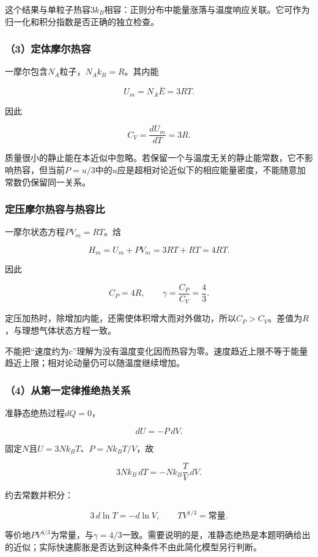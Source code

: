 \documentclass[12pt,a4paper,fontset=fandol]{ctexart}
\begin{document}
这个结果与单粒子热容\(3k_B\)相容：正则分布中能量涨落与温度响应关联。它可作为归一化和积分指数是否正确的独立检查。

\subsubsection{（3）定体摩尔热容}\label{ux5b9aux4f53ux6469ux5c14ux70edux5bb9}

一摩尔包含\(N_A\)粒子，\(N_Ak_B=R\)。其内能

\[
U_m=N_A\bar E=3RT.
\]

因此

\[
\boxed{C_V=\frac{dU_m}{dT}=3R}.
\]

质量很小的静止能在本近似中忽略。若保留一个与温度无关的静止能常数，它不影响热容，但当前\(P=u/3\)中的\(u\)应是超相对论近似下的相应能量密度，不能随意加常数仍保留同一关系。

\subsubsection{定压摩尔热容与热容比}\label{ux5b9aux538bux6469ux5c14ux70edux5bb9ux4e0eux70edux5bb9ux6bd4}

一摩尔状态方程\(PV_m=RT\)。焓

\[
H_m=U_m+PV_m=3RT+RT=4RT.
\]

因此

\[
\boxed{C_P=4R,\qquad\gamma=\frac{C_P}{C_V}=\frac43}.
\]

定压加热时，除增加内能，还需使体积增大而对外做功，所以\(C_P>C_V\)。差值为\(R\)，与理想气体状态方程一致。

不能把``速度约为\(c\)''理解为没有温度变化因而热容为零。速度趋近上限不等于能量趋近上限；相对论动量仍可以随温度继续增加。

\subsubsection{（4）从第一定律推绝热关系}\label{ux4eceux7b2cux4e00ux5b9aux5f8bux63a8ux7eddux70edux5173ux7cfb}

准静态绝热过程\(dQ=0\)，

\[
dU=-P\,dV.
\]

固定\(N\)且\(U=3Nk_BT\)、\(P=Nk_BT/V\)，故

\[
3Nk_B\,dT=-Nk_B\frac{T}{V}\,dV.
\]

约去常数并积分：

\[
3\,d\ln T=-d\ln V,
\qquad
\boxed{TV^{1/3}=\text{常量}}.
\]

等价地\(PV^{4/3}\)为常量，与\(\gamma=4/3\)一致。需要说明的是，准静态绝热是本题明确给出的近似；实际快速膨胀是否达到这种条件不由此简化模型另行判断。
\end{document}
